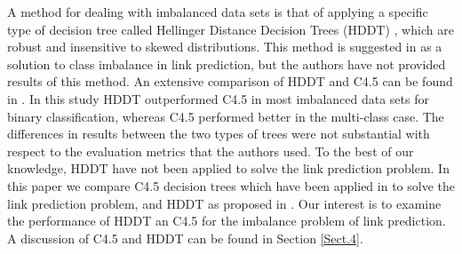 \documentclass{acm_proc_article-sp}
\begin{document}
A method for dealing with imbalanced data sets is that of applying a specific type of decision tree called Hellinger Distance Decision Trees (HDDT) \cite{Cieslak2008, Cieslak2012}, which are robust and insensitive to skewed distributions. This method is suggested in \cite{Lichtenwalter:2010:NPM:1835804.1835837} as a solution to class imbalance in link prediction, but the authors have not provided results of this method. An extensive comparison of HDDT and C4.5 can be found in \cite{Cieslak2012}. In this study HDDT outperformed C4.5 in most imbalanced data sets for binary classification, whereas C4.5 performed better in the multi-class case. The differences in results between the two types of trees were not substantial with respect to the evaluation metrics that the authors used. To the best of our knowledge, HDDT have not been applied to solve the link prediction problem. In this paper we compare C4.5 decision trees \cite{quinlan2014c4} which have been applied in \cite{Hasan06linkprediction} to solve the link prediction problem, and HDDT as proposed in \cite{Lichtenwalter:2010:NPM:1835804.1835837}. Our interest is to examine the performance of HDDT an C4.5 for the imbalance problem of link prediction. A discussion of C4.5 and HDDT can be found in Section \ref{Sect.4}. 

\end{document}
